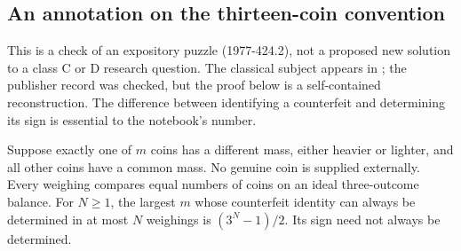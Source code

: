 \subsection{An annotation on the thirteen-coin convention}

This is a check of an expository puzzle (1977-424.2), not a proposed new
solution to a class C or D research question.  The classical subject appears
in \citet{dyson1946pennies}; the publisher record was checked, but the proof
below is a self-contained reconstruction.  The difference between identifying
a counterfeit and determining its sign is essential to the notebook's number.

\begin{proposition}\ours
Suppose exactly one of \(m\) coins has a different mass, either heavier or
lighter, and all other coins have a common mass.  No genuine coin is supplied
externally.  Every weighing compares equal numbers of coins on an ideal
three-outcome balance.  For \(N\geq1\), the largest \(m\) whose counterfeit
identity can always be determined in at most \(N\) weighings is
\((3^N-1)/2\).  Its sign need not always be determined.
\end{proposition}

